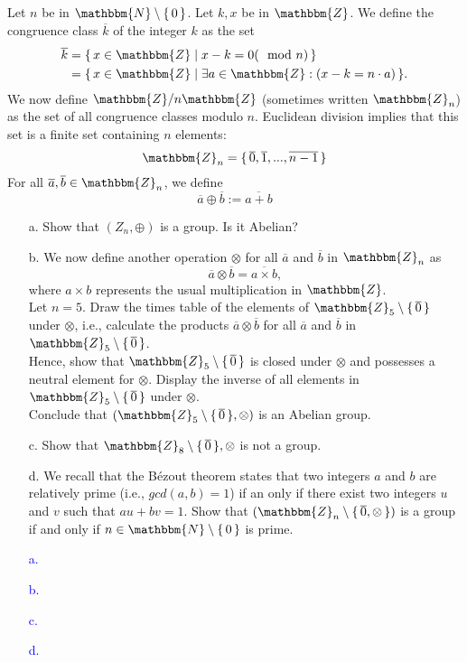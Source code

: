 \documentclass[a4paper,12pt]{article}
\newcommand{\Br}[1]{\{\, #1 \,\}}
\newcommand{\Z}{\mathbbm{Z}}
\newcommand{\N}{\mathbbm{N}}
\begin{document}
\subsection{}
Let $n$ be in $\N \setminus \Br{0}$. Let $k,x$ be in $\Z$. We define the congruence class $\overline{k}$ of the integer $k$ as the set
\begin{align*}
\overline{k} &= \Br{ x \in \Z \mid x-k=0 (\mod n) } \vspace{1mm}\\
&= \Br{ x \in \Z \mid \exists a \in \Z: (x-k = n \cdot a) }.
\end{align*}
We now define $\Z / n\Z$ (sometimes written $\Z_n$) as the set of all congruence classes modulo $n$. Euclidean division implies that this set is a finite set containing $n$ elements:
$$\Z_n = \Br{\overline{0}, \overline{1},...,\overline{n-1}}$$
For all $\overline{a}, \overline{b} \in \Z_n$, we define 
$$\overline{a} \oplus \overline{b} := \overline{a+b}$$
\begin{itemize}
 \item [a.] Show that $(Z_n,\oplus)$ is a group. Is it Abelian?
 \item [b.] We now define another operation $\otimes$ for all $\overline{a}$ and $\overline{b}$ in $\Z_n$ as 
 $$\overline{a} \otimes \overline{b} = \overline{a \times b},$$
 where $a \times b$ represents the usual multiplication in $\Z$.\\
 Let $n=5$. Draw the times table of the elements of $\Z_5 \setminus \Br{\overline{0}}$ under $\otimes$, i.e., calculate the products $\overline{a} \otimes \overline{b}$ for all $\overline{a}$ and $\overline{b}$ in $\Z_5 \setminus \Br{\overline{0}}$.\\
 Hence, show that $\Z_5 \setminus \Br{\overline{0}}$ is closed under $\otimes$ and possesses a neutral element for $\otimes$. 
 Display the inverse of all elements in $\Z_5 \setminus \Br{\overline{0}}$ under $\otimes$.\\
 Conclude that $(\Z_5 \setminus \Br{\overline{0}}, \otimes)$ is an Abelian group.
 \item [c.] Show that $\Z_8 \setminus \Br{\overline{0}}, \otimes$ is not a group.
 \item [d.] We recall that the Bézout theorem states that two integers $a$ and $b$ are relatively prime (i.e., $gcd(a,b)=1$) if an only if there exist two integers $u$ and $v$ such that $au+bv=1$. Show that $(\Z_n \setminus \Br{\overline{0}, \otimes})$ is a group if and only if $n \in \N \setminus \Br{0}$ is prime.
\end{itemize}
\textcolor{blue}{
\begin{itemize}
 \item [a.] 
 \item [b.] 
 \item [c.] 
 \item [d.] 
\end{itemize}
}
\end{document}

